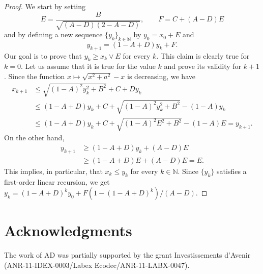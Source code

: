 \documentclass[aoap,preprint,reqno,a4paper]{imsart} %
\newcommand{\NN}{\mathbb{N}}
\begin{document}
\begin{proof}
We start by setting
$$
E = \frac{B}{\sqrt{(A-D)(2-A-D)}},\qquad F = C+ (A-D)E
$$
and by defining a new sequence $\{y_k\}_{k\in\NN}$ by
$y_0 = x_0+ E$ and
$$
y_{k+1} = (1-A+D)y_k + F.
$$
Our goal is to prove that $y_k\ge x_k\vee E$ for every $k$.
This claim is clearly true for $k=0$. Let us assume that it
is true for the value $k$ and prove its validity for $k+1$.
Since the function $x\mapsto \sqrt{x^2+a^2} - x$ is decreasing,
we have
\begin{align}
x_{k+1}
		&\le \sqrt{(1-A)^2y_k^2+B^2}+C+Dy_k\\
		&\le (1-A+D)y_k +C + \sqrt{(1-A)^2y_k^2+B^2}-(1-A)y_k\\
		&\le (1-A+D)y_k +C + \sqrt{(1-A)^2E^2+B^2}-(1-A)E = y_{k+1}.
\end{align}
On the other hand,
\begin{align}
y_{k+1}
		&\ge (1-A+D)y_k + (A-D)E\\
		&\ge (1-A+D)E + (A-D)E = E.
\end{align}
This implies, in particular, that $x_k\le y_k$ for every $k\in\NN$.
Since $\{y_k\}$ satisfies a first-order linear recursion, we get
$y_k = (1-A+D)^ky_0 + F(1-(1-A+D)^k)/(A-D)$. %
\end{proof}
{\renewcommand{\addtocontents}[2]{}

\section*{Acknowledgments}
The work of AD was partially supported by the grant
Investissements d'Avenir (ANR-11-IDEX-0003/Labex Ecodec/ANR-11-LABX-0047).
}%





{\renewcommand{\addtocontents}[2]{}
}
\end{document}
